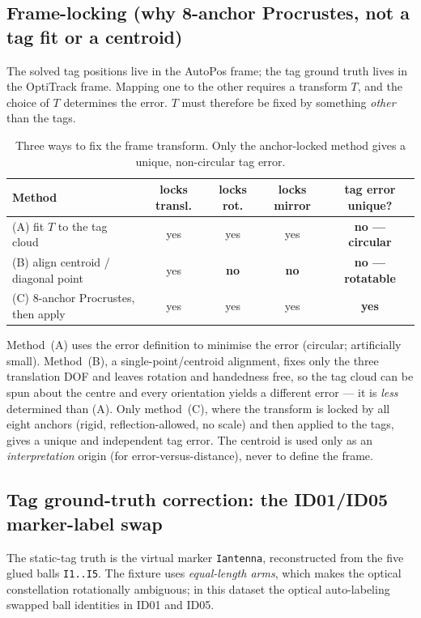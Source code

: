 \documentclass[11pt,a4paper]{article}
\begin{document}
\subsection{Frame-locking (why 8-anchor Procrustes, not a tag fit or a centroid)}
\label{sec:framelock}
The solved tag positions live in the AutoPos frame; the tag ground truth lives in the
OptiTrack frame. Mapping one to the other requires a transform $T$, and the choice of $T$
determines the error. $T$ must therefore be fixed by something \emph{other} than the tags.

\begin{table}[h]
\centering
\caption{Three ways to fix the frame transform. Only the anchor-locked method gives a
unique, non-circular tag error.}
\begin{tabular}{p{4.4cm}cccc}
\toprule
Method & locks transl. & locks rot. & locks mirror & tag error unique? \\
\midrule
(A) fit $T$ to the tag cloud         & yes & yes & yes & \textbf{no --- circular} \\
(B) align centroid / diagonal point  & yes & \textbf{no} & \textbf{no} & \textbf{no --- rotatable} \\
(C) 8-anchor Procrustes, then apply  & yes & yes & yes & \textbf{yes} \\
\bottomrule
\end{tabular}
\end{table}

\noindent
Method~(A) uses the error definition to minimise the error (circular; artificially small).
Method~(B), a single-point/centroid alignment, fixes only the three translation DOF and
leaves rotation and handedness free, so the tag cloud can be spun about the centre and every
orientation yields a different error --- it is \emph{less} determined than (A). Only
method~(C), where the transform is locked by all eight anchors (rigid, reflection-allowed,
no scale) and then applied to the tags, gives a unique and independent tag error. The
centroid is used only as an \emph{interpretation} origin (for error-versus-distance), never
to define the frame.

\subsection{Tag ground-truth correction: the ID01/ID05 marker-label swap}
\label{sec:swap}
The static-tag truth is the virtual marker \texttt{Iantenna}, reconstructed from the five
glued balls \texttt{I1..I5}. The fixture uses \emph{equal-length arms}, which makes the
optical constellation rotationally ambiguous; in this dataset the optical auto-labeling
swapped ball identities in ID01 and ID05.
\end{document}
